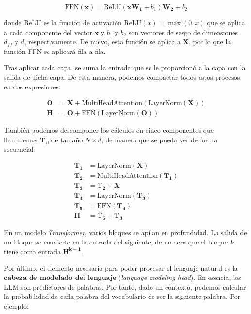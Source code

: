 \documentclass[12pt,twoside]{article}
\begin{document}
\begin{equation}
    \text{FFN}(\mathbf{x})=\text{ReLU}(\mathbf{xW_1}+b_1)\mathbf{W_2}+b_2
\end{equation}

donde ReLU es la función de activación ReLU$(x)=\max(0,x)$ que se aplica a cada componente del vector $\mathbf{x}$ y $b_1$ y $b_2$ son vectores de sesgo de dimensiones $d_{ff}$ y $d$, respectivamente. De nuevo, esta función se aplica a $\mathbf{X}$, por lo que la función FFN se aplicará fila a fila.

Tras aplicar cada capa, se suma la entrada que se le proporcionó a la capa con la salida de dicha capa. De esta manera, podemos compactar todos estos procesos en dos expresiones:

\begin{align}
    \mathbf{O} &= \mathbf{X}+\text{MultiHeadAttention}(\text{LayerNorm}(\mathbf{X})) \\
    \mathbf{H} &= \mathbf{O}+\text{FFN}(\text{LayerNorm}(\mathbf{O}))
\end{align}

También podemos descomponer los cálculos en cinco componentes que llamaremos $\mathbf{T_i}$, de tamaño $N\times d$, de manera que se pueda ver de forma secuencial:

\begin{align}
    \mathbf{T_1} &= \text{LayerNorm}(\mathbf{X})\\
    \mathbf{T_2} &= \text{MultiHeadAttention}(\mathbf{T_1})\\
    \mathbf{T_3} &= \mathbf{T_2}+\mathbf{X}\\
    \mathbf{T_4} &= \text{LayerNorm}(\mathbf{T_3})\\
    \mathbf{T_5} &= \text{FFN}(\mathbf{T_4})\\
    \mathbf{H} &= \mathbf{T_5}+\mathbf{T_3}
\end{align}

En un modelo \textit{Transformer}, varios bloques se apilan en profundidad. La salida de un bloque se convierte en la entrada del siguiente, de manera que el bloque $k$ tiene como entrada $\mathbf{H^{k-1}}$.

Por último, el elemento necesario para poder procesar el lenguaje natural es la \textbf{cabeza de modelado del lenguaje} (\textit{language modeling head}). En esencia, los LLM son predictores de palabras. Por tanto, dado un contexto, podemos calcular la probabilidad de cada palabra del vocabulario de ser la siguiente palabra. Por ejemplo:
\end{document}
